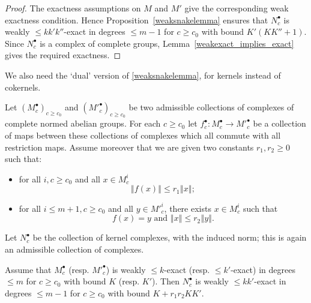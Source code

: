 \begin{proof}
  The exactness assumptions on $M$ and $M'$ give the corresponding
  weak exactness condition. Hence Proposition~\ref{weaksnakelemma}
  ensures that $N^\bullet_c$ is weakly $\leq kk'k''$-exact in degrees
  $\leq m-1$ for $c\geq c_0$ with bound $K'(KK'' + 1)$.
  Since $N^\bullet_c$ is a complex of complete groups,
  Lemma~\ref{weakexact_implies_exact} gives the required exactness.
\end{proof}

We also need the `dual' version of \ref{weaksnakelemma}, for kernels instead of cokernels.

\begin{proposition}
  \label{weaksnakelemma}
  \leanok
  Let $(M^\bullet_c)_{c\geq c_0}$ and $(M'^\bullet_c)_{c\geq c_0}$ be two admissible collections
  of complexes of complete normed abelian groups.
  For each $c\geq c_0$ let $f^\bullet_c: M^\bullet_c\to M'^\bullet_c$ be a collection of maps
  between these collections of complexes which all commute with all restriction maps.
  Assume moreover that we are given two constants $r_1, r_2 \geq 0$ such that:
  \begin{itemize}
   \item for all $i, c\geq c_0$ and all $x\in M^i_c$
    \[
    ‖f(x)‖ ≤ r_1‖x‖;
    \]
   \item for all $i ≤ m+1, c \geq c_0$ and all $y\in M'^i_c$, there exists $x\in M^i_c$ such that
   \[
    f(x) = y \mbox{ and } ‖x‖ ≤ r_2‖y‖.
   \]

  \end{itemize}

  Let $N^\bullet_c$ be the collection of kernel complexes, with the induced norm;
  this is again an admissible collection of complexes.

  Assume that $M^\bullet_c$ (resp. $M'^\bullet_c$) is weakly $\leq k$-exact
  (resp. $≤ k'$-exact) in degrees $\leq m$ for $c\geq c_0$ with bound $K$
  (resp. $K'$).
  Then $N^\bullet_c$ is weakly $\leq kk'$-exact in degrees $\leq m-1$ for $c\geq c_0$
  with bound $K + r_1r_2KK'$.
\end{proposition}

